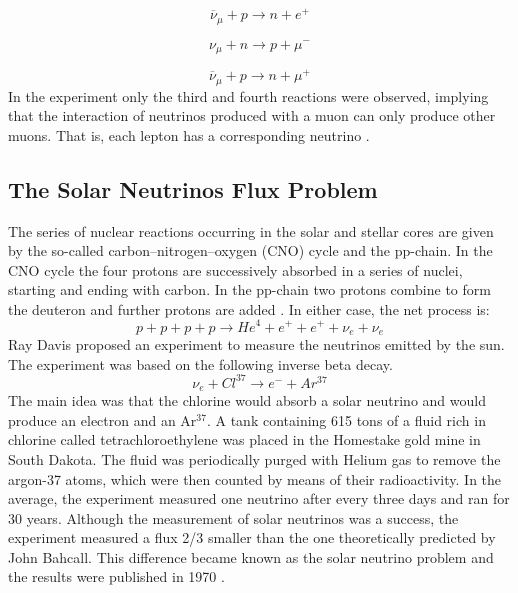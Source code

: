 \begin{equation}
	\overline{\nu}_{\mu} + p \longrightarrow n + e^+
	\label{lss_segunda}
\end{equation}

\begin{equation}
	\nu_{\mu} + n \longrightarrow p + \mu^-
	\label{lss_terceira}
\end{equation}
 
\begin{equation}
	\overline{\nu}_{\mu} + p \longrightarrow n + \mu^+
	\label{lss_quarta}
\end{equation}
%
In the experiment only the third and fourth reactions were observed, implying that the interaction of neutrinos produced with a muon can only produce other muons. That is, each lepton has a corresponding neutrino \cite{two_neutrinos}.

\subsection{The Solar Neutrinos Flux Problem}
The series of nuclear reactions occurring in the solar and stellar cores are given by the so-called carbon–nitrogen–oxygen (CNO) cycle and the pp-chain. In the CNO cycle the four protons are successively absorbed in a series of nuclei, starting and ending with carbon. In the pp-chain two protons combine to form the deuteron and further protons are added \cite{the_story_of_the_neutrino}. In either case, the net process is:
%
\begin{equation}
	p+p+p+p \longrightarrow He^4 +e^+ + e^+ +\nu_e +\nu_e
	\label{solar_reaction}
\end{equation}
%
Ray Davis proposed an experiment to measure the neutrinos emitted by the sun. The experiment was based on the following inverse beta decay.
%
\begin{equation}
		\nu_e + Cl^{37} \longrightarrow e^- +Ar^{37}
		\label{solar_reaction}
\end{equation}
%
The main idea was that the chlorine would absorb a solar neutrino and would produce an electron and an Ar$^{37}$. A tank containing 615 tons of a fluid rich in chlorine called tetrachloroethylene was placed in the Homestake gold mine in South Dakota. The fluid was periodically purged with Helium gas to remove the argon-37 atoms, which were then counted by means of their radioactivity. In the average, the experiment measured one neutrino after every three days and ran for 30 years. Although the measurement of solar neutrinos was a success, the experiment measured a flux 2/3 smaller than the one theoretically predicted by John Bahcall. This difference became known as the solar neutrino problem and the results were published in 1970 \cite{the_story_of_the_neutrino}.

